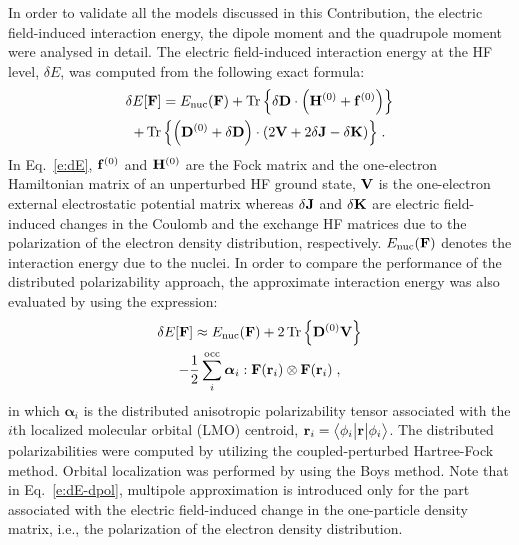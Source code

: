 \documentclass[aip,amsmath,amssymb,reprint]{revtex4-1}
\newcommand{\tbraket}[3]{\ensuremath{\bigl\langle {#1} \bigl\lvert {#2} \bigl\lvert {#3} \bigr\rangle}}
\newcommand{\BM}[1]{\bm{#1}}
\DeclareMathOperator{\Tr}{Tr}
\begin{document}
In order to validate all the models discussed in this Contribution,
the electric field\hyp{}induced interaction energy, 
the dipole moment and the quadrupole moment were analysed in detail.
The electric field\hyp{}induced interaction energy at the HF level, $\delta E$,
was computed from the following exact formula:
%
\begin{multline}\label{e:dE}
 \delta E[{\bf F}] = E_{\rm nuc}({\bf F}) +
                     \Tr{\left\{ \delta {\bf D} \cdot
                                \left( {\bf H}^{(0)} + {\bf f}^{(0)} \right) \right\}} \\
                   + \Tr{\left\{ \left( {\bf D}^{(0)} + \delta {\bf D} \right) \cdot
                                \left( 2{\bf V} + 2\delta {\bf J} - \delta {\bf K}\right) \right\}} \;.
\end{multline}
%
In Eq.~\eqref{e:dE}, ${\bf f}^{(0)}$ and ${\bf H}^{(0)}$ are the Fock matrix and 
the one\hyp{}electron Hamiltonian matrix of an unperturbed HF ground state,
${\bf V}$ is the one\hyp{}electron external electrostatic potential matrix whereas $\delta {\bf J}$
and $\delta {\bf K}$ are electric field\hyp{}induced changes in the Coulomb and the exchange HF matrices due to 
the polarization of the electron density distribution, respectively. $E_{\rm nuc}({\bf F})$ denotes the interaction energy
due to the nuclei.
In order to compare the performance of the distributed polarizability approach,
the approximate interaction energy was also evaluated by using the expression:
%
\begin{multline}\label{e:dE-dpol}
 \delta E[{\bf F}] \approx E_{\rm nuc}({\bf F}) + 
                     2 \Tr{\left\{ {\bf D}^{(0)} {\bf V}\right\} }  \\
                   - \frac{1}{2} \sum_i^{\rm occ} {\BM \alpha}_i : {\bf F}({\bf r}_i) \otimes {\bf F}({\bf r}_i) \;,
\end{multline}
%
in which ${\BM \alpha}_i$ is the distributed anisotropic polarizability tensor associated with the
$i$th localized molecular orbital (LMO) centroid, ${\bf r}_i = \tbraket{\phi_i}{\bf r}{\phi_i}$.
The distributed polarizabilities were computed by utilizing the coupled\hyp{}perturbed Hartree\hyp{}Fock
method. Orbital localization was performed by using the Boys method. Note that in Eq.~\eqref{e:dE-dpol}, 
multipole approximation is introduced only for the part associated with the electric field\hyp{}induced
change in the one\hyp{}particle density matrix, i.e., the polarization of the electron density distribution.
\end{document}
